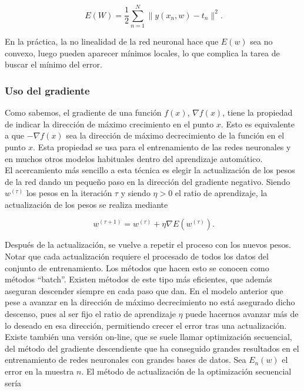 \[
\ E(W)= \frac{1}{2} \sum_{n=1}^N \parallel y(x_n,w)-t_n \parallel^2 .
\]

En la práctica, la no linealidad de la red neuronal hace que $E(w)$ sea no convexo, luego pueden aparecer mínimos locales, lo que complica la tarea de buscar el mínimo del error.\\

\subsubsection{Uso del gradiente}

Como sabemos, el gradiente de una función $f(x)$, $\nabla f(x)$, tiene la propiedad de indicar la dirección de máximo crecimiento en el punto $x$. Esto es equivalente a que $-\nabla f(x)$ sea la dirección de máximo decrecimiento de la función en el punto $x$. Esta propiedad se usa para el entrenamiento de las redes neuronales y en muchos otros modelos habituales dentro del aprendizaje automático.\\

El acercamiento más sencillo a esta técnica es elegir la actualización de los pesos de la red dando un pequeño paso en la dirección del gradiente negativo. Siendo $w^{(\tau)}$ los pesos en la iteración $\tau$ y siendo $\eta>0$ el ratio de aprendizaje, la actualización de los pesos se realiza mediante

\[
\ w^{(\tau +1)}=w^{(\tau)}+\eta \nabla E(w^{(\tau)}) .
\]

Después de la actualización, se vuelve a repetir el proceso con los nuevos pesos. Notar que cada actualización requiere el procesado de todos los datos del conjunto de entrenamiento. Los métodos que hacen esto se conocen como métodos ``batch''. Existen métodos de este tipo más eficientes, que además aseguran descender siempre en cada paso que dan. En el modelo anterior que pese a avanzar en la dirección de máximo decrecimiento no está asegurado dicho descenso, pues al ser fijo el ratio de aprendizaje $\eta$ puede hacernos avanzar más de lo deseado en esa dirección, permitiendo crecer el error tras una actualización.\\

Existe también una versión on-line, que se suele llamar optimización secuencial, del método del gradiente descendiente que ha conseguido grandes resultados en el entrenamiento de redes neuronales con grandes bases de datos. Sea $E_n(w)$ el error en la muestra $n$. El método de actualización de la optimización secuencial sería

